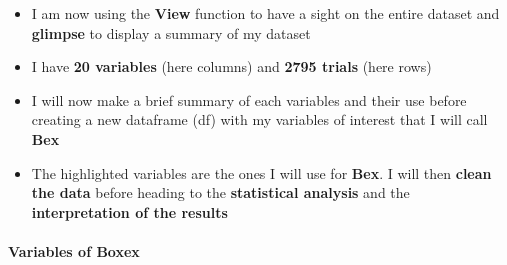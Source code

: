 \documentclass[
]{article}
\begin{document}
\begin{itemize}
\item
  I am now using the \textbf{View} function to have a sight on the
  entire dataset and \textbf{glimpse} to display a summary of my dataset
\item
  I have \textbf{20 variables} (here columns) and \textbf{2795 trials}
  (here rows)
\item
  I will now make a brief summary of each variables and their use before
  creating a new dataframe (df) with my variables of interest that I
  will call \textbf{Bex}
\item
  The highlighted variables are the ones I will use for \textbf{Bex}. I
  will then \textbf{clean the data} before heading to the
  \textbf{statistical analysis} and the \textbf{interpretation of the
  results}
\end{itemize}

\hypertarget{variables-of-boxex}{%
\paragraph{Variables of Boxex}\label{variables-of-boxex}}
\end{document}
